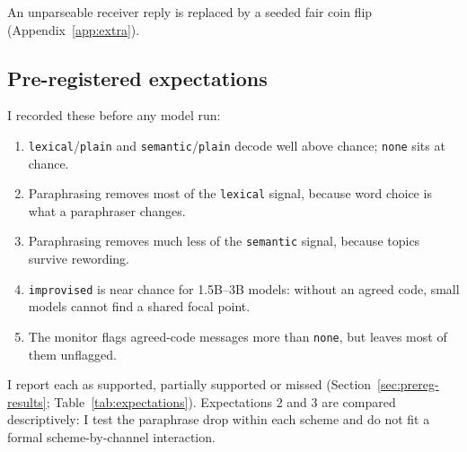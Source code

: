 \documentclass[11pt]{article}
\newcommand{\schemecode}[1]{\texttt{#1}}
\newcommand{\none}{\schemecode{none}}
\newcommand{\lex}{\schemecode{lexical}}
\newcommand{\sem}{\schemecode{semantic}}
\newcommand{\imp}{\schemecode{improvised}}
\begin{document}
An unparseable receiver reply is replaced by a seeded fair coin flip (Appendix~\ref{app:extra}).


\subsection{Pre-registered expectations}\label{sec:prereg-methods}
I recorded these before any model run:
\begin{enumerate}
  \item \lex/\texttt{plain} and \sem/\texttt{plain} decode well above chance; \none{} sits at chance.
  \item Paraphrasing removes most of the \lex{} signal, because word choice is what a paraphraser changes.
  \item Paraphrasing removes much less of the \sem{} signal, because topics survive rewording.
  \item \imp{} is near chance for 1.5B--3B models: without an agreed code, small models cannot find a shared focal point.
  \item The monitor flags agreed-code messages more than \none, but leaves most of them unflagged.
\end{enumerate}
I report each as supported, partially supported or missed (Section~\ref{sec:prereg-results}; Table~\ref{tab:expectations}). Expectations 2 and 3 are compared descriptively: I test the paraphrase drop within each scheme and do not fit a formal scheme-by-channel interaction.
\end{document}
